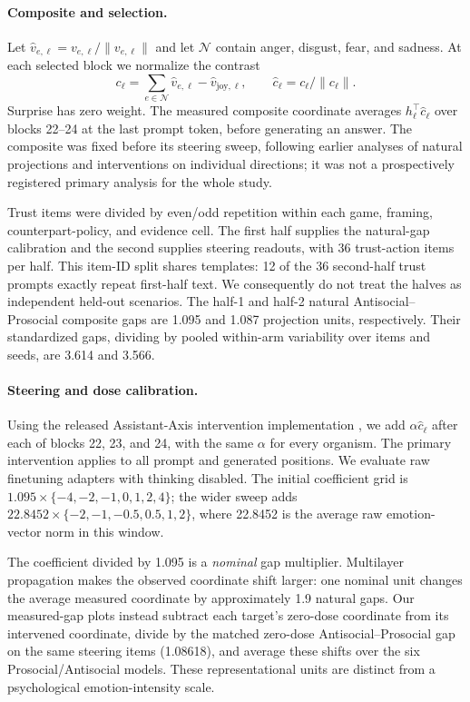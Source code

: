 \documentclass{article} %
\begin{document}
\paragraph{Composite and selection.}
Let $\widehat v_{e,\ell}=v_{e,\ell}/\|v_{e,\ell}\|$ and let $\mathcal N$ contain anger, disgust, fear, and sadness. At each selected block we normalize the contrast
\[
c_\ell = \sum_{e\in\mathcal N}\widehat v_{e,\ell}
-\widehat v_{\mathrm{joy},\ell},
\qquad \widehat c_\ell=c_\ell/\|c_\ell\|.
\]
Surprise has zero weight. The measured composite coordinate averages $h_\ell^\top\widehat c_\ell$ over blocks 22--24 at the last prompt token, before generating an answer. The composite was fixed before its steering sweep, following earlier analyses of natural projections and interventions on individual directions; it was not a prospectively registered primary analysis for the whole study.

Trust items were divided by even/odd repetition within each game, framing, counterpart-policy, and evidence cell. The first half supplies the natural-gap calibration and the second supplies steering readouts, with 36 trust-action items per half. This item-ID split shares templates: 12 of the 36 second-half trust prompts exactly repeat first-half text. We consequently do not treat the halves as independent held-out scenarios. The half-1 and half-2 natural Antisocial--Prosocial composite gaps are 1.095 and 1.087 projection units, respectively. Their standardized gaps, dividing by pooled within-arm variability over items and seeds, are 3.614 and 3.566.

\paragraph{Steering and dose calibration.}
Using the released Assistant-Axis intervention implementation \citep{lu2026assistant}, we add $\alpha\widehat c_\ell$ after each of blocks 22, 23, and 24, with the same $\alpha$ for every organism. The primary intervention applies to all prompt and generated positions. We evaluate raw finetuning adapters with thinking disabled. The initial coefficient grid is $1.095\times\{-4,-2,-1,0,1,2,4\}$; the wider sweep adds $22.8452\times\{-2,-1,-0.5,0.5,1,2\}$, where 22.8452 is the average raw emotion-vector norm in this window.

The coefficient divided by 1.095 is a \emph{nominal} gap multiplier. Multilayer propagation makes the observed coordinate shift larger: one nominal unit changes the average measured coordinate by approximately 1.9 natural gaps. Our measured-gap plots instead subtract each target's zero-dose coordinate from its intervened coordinate, divide by the matched zero-dose Antisocial--Prosocial gap on the same steering items (1.08618), and average these shifts over the six Prosocial/Antisocial models. These representational units are distinct from a psychological emotion-intensity scale.
\end{document}
